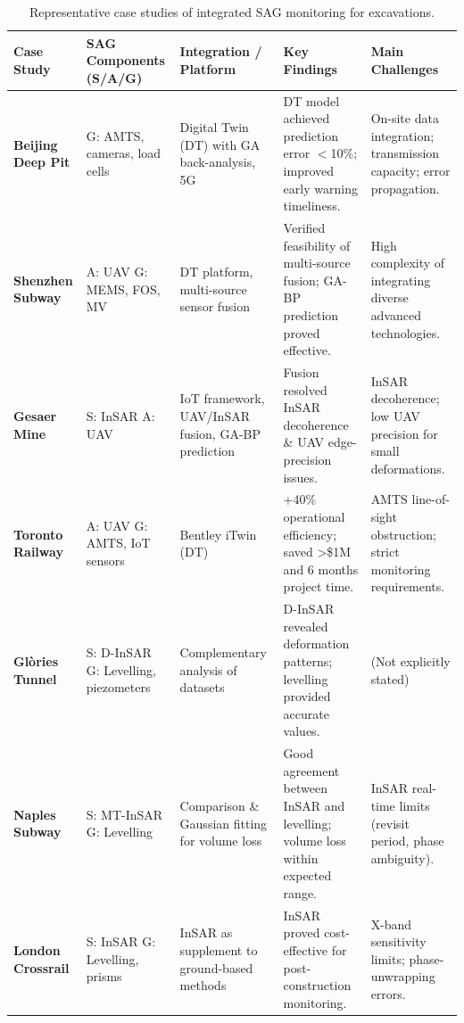 \documentclass[preprint,11pt,authoryear,3p]{elsarticle}
\begin{document}
\begin{table}[htbp]
  \centering
  \caption{Representative case studies of integrated SAG monitoring for excavations.}
  \label{tab:excavation_monitoring}
  \small %
  \begin{tabular}{p{2.5cm} p{2.8cm} p{2.8cm} p{3.2cm} p{3cm}}
    \toprule
    \textbf{Case Study} & \textbf{SAG Components (S/A/G)} & \textbf{Integration / Platform} & \textbf{Key Findings} & \textbf{Main Challenges} \\
    \midrule
    \textbf{Beijing Deep Pit} \citep{buildings15030366} &
      G: AMTS, cameras, load cells &
      Digital Twin (DT) with GA back-analysis, 5G &
      DT model achieved prediction error $<$10\%; improved early warning timeliness. &
      On-site data integration; transmission capacity; error propagation. \\
    \midrule
    \textbf{Shenzhen Subway} \citep{AnIntegratedIntelligent} &
      A: UAV \newline G: MEMS, FOS, MV &
      DT platform, multi-source sensor fusion &
      Verified feasibility of multi-source fusion; GA-BP prediction proved effective. &
      High complexity of integrating diverse advanced technologies. \\
    \midrule
    \textbf{Gesaer Mine} \citep{chen_mining_2025} &
      S: InSAR \newline A: UAV &
      IoT framework, UAV/InSAR fusion, GA-BP prediction &
      Fusion resolved InSAR decoherence \& UAV edge-precision issues. &
      InSAR decoherence; low UAV precision for small deformations. \\
    \midrule
    \textbf{Toronto Railway} \citep{GeoWeekNewsMonirDT} &
      A: UAV \newline G: AMTS, IoT sensors &
      Bentley iTwin (DT) &
      +40\% operational efficiency; saved >\$1M and 6 months project time. &
      AMTS line-of-sight obstruction; strict monitoring requirements. \\
    \midrule
    \textbf{Glòries Tunnel} \citep{BOTEYIBASSOLS2021106041,SERRANOJUAN20171} &
      S: D-InSAR \newline G: Levelling, piezometers &
      Complementary analysis of datasets &
      D-InSAR revealed deformation patterns; levelling provided accurate values. &
      (Not explicitly stated) \\
    \midrule
    \textbf{Naples Subway} \citep{rs15102555} &
      S: MT-InSAR \newline G: Levelling &
      Comparison \& Gaussian fitting for volume loss &
      Good agreement between InSAR and levelling; volume loss within expected range. &
      InSAR real-time limits (revisit period, phase ambiguity). \\
    \midrule
    \textbf{London Crossrail} \citep{marti2017use} &
      S: InSAR \newline G: Levelling, prisms &
      InSAR as supplement to ground-based methods &
      InSAR proved cost-effective for post-construction monitoring. &
      X-band sensitivity limits; phase-unwrapping errors. \\
    \bottomrule
  \end{tabular}
\end{table}
\end{document}
